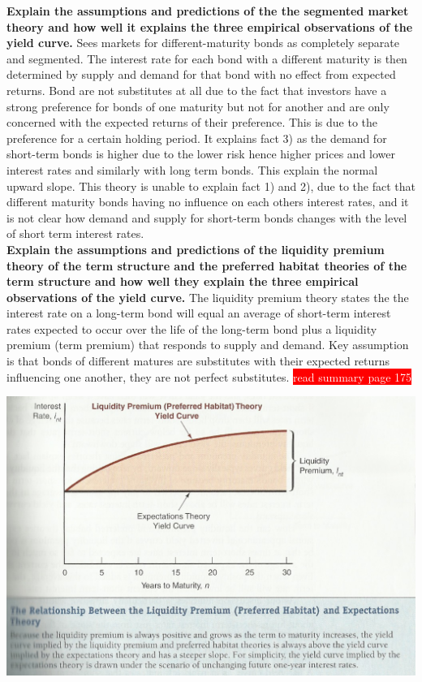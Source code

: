 \documentclass[12pt]{examnotes}
\begin{document}
\textbf{Explain the assumptions and predictions of the the segmented market theory and how well it explains the three empirical observations of the yield curve.}
Sees markets for different-maturity bonds as completely separate and segmented. The interest rate for each bond with a different maturity is then determined by supply and demand for that bond with no effect from expected returns. Bond are not substitutes at all due to the fact that investors have a strong preference for bonds of one maturity but not for another and are only concerned with the expected returns of their preference. This is due to the preference for a certain holding period. It explains fact 3) as the demand for short-term bonds is higher due to the lower risk hence higher prices and lower interest rates and similarly with long term bonds. This explain the normal upward slope. This theory is unable to explain fact 1) and 2), due to the fact that different maturity bonds having no influence on each others interest rates, and it is not clear how demand and supply for short-term bonds changes with the level of short term interest rates. \\

\textbf{Explain the assumptions and predictions of the liquidity premium theory of the term structure and the preferred habitat theories of the term structure and how well they explain the three empirical observations of the yield curve.}
The liquidity premium theory states the the interest rate on a long-term bond will equal an average of short-term interest rates expected to occur over the life of the long-term bond plus a liquidity premium (term premium) that responds to supply and demand. Key assumption is that bonds of different matures are substitutes with their expected returns influencing one another, they are not perfect substitutes.
\colorbox{red}{\textcolor{white}{read summary page 175}}
\begin{center}
  \includegraphics[scale=0.5]{./imgs/c6f5.jpg}
\end{center}
\end{document}
